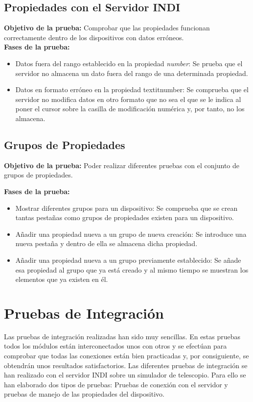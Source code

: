 \subsection{Propiedades con el Servidor INDI}
\textbf{Objetivo de la prueba:} Comprobar que las propiedades funcionan correctamente dentro de los dispositivos con datos erróneos.\\

\textbf{Fases de la prueba:}
\begin{itemize}
  \item Datos fuera del rango establecido en la propiedad \textit{number}: Se prueba que el servidor no almacena un dato fuera del rango de una determinada propiedad.
  \item Datos en formato erróneo en la propiedad textit{number}: Se comprueba que el servidor no modifica datos en otro formato que no sea el que se le indica al poner el cursor sobre la casilla de modificación numérica y, por tanto, no los almacena.
\end{itemize}

\subsection{Grupos de Propiedades}
\textbf{Objetivo de la prueba:} Poder realizar diferentes pruebas con el conjunto de grupos de propiedades.

\textbf{Fases de la prueba:}
\begin{itemize}
  \item Mostrar diferentes grupos para un dispositivo: Se comprueba que se crean tantas pestañas como grupos de propiedades existen para un dispositivo.
  \item Añadir una propiedad nueva a un grupo de nueva creación: Se introduce una nueva pestaña y dentro de ella se almacena dicha propiedad.
  \item Añadir una propiedad nueva a un grupo previamente establecido: Se añade esa propiedad al grupo que ya está creado y al mismo tiempo se muestran los elementos que ya existen en él.
\end{itemize}

\section{Pruebas de Integración}
Las pruebas de integración realizadas han sido muy sencillas. En estas pruebas todos los módulos están interconectados unos con otros y se efectúan para comprobar que todas las conexiones están bien practicadas y, por consiguiente, se obtendrán unos resultados satisfactorios. Las diferentes pruebas de integración se han realizado con el servidor INDI sobre un simulador de telescopio. Para ello se han elaborado dos tipos de pruebas: Pruebas de conexión con el servidor y pruebas de manejo de las propiedades del dispositivo.

